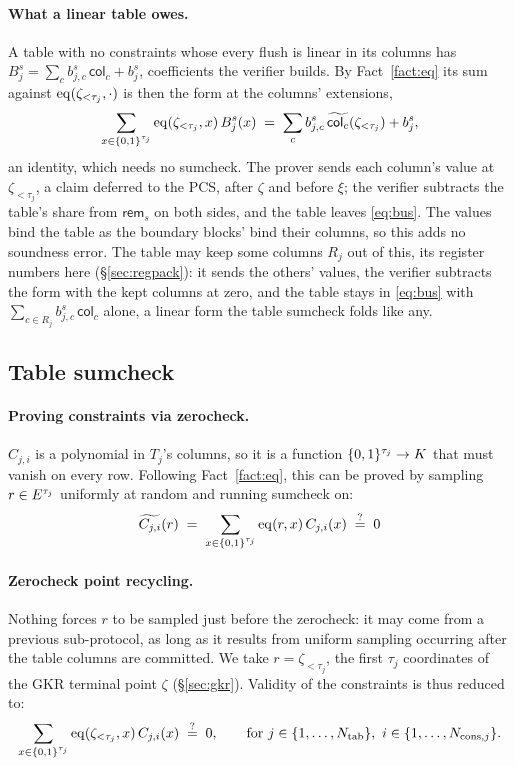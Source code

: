 \paragraph{What a linear table owes.} A table with no constraints whose every flush is linear in its columns has $B^{s}_j=\sum_c b^{s}_{j,c}\,\mathsf{col}_c+b^{s}_{j}$, coefficients the verifier builds. By Fact~\ref{fact:eq} its sum against $\operatorname{eq}(\zeta_{<\tau_j},\cdot)$ is then the form at the columns' extensions,
\[
  \sum_{x\in\{0,1\}^{\tau_j}}\operatorname{eq}(\zeta_{<\tau_j},x)\,B^{s}_j(x)\;=\;\sum_c b^{s}_{j,c}\,\widetilde{\mathsf{col}_c}(\zeta_{<\tau_j})+b^{s}_{j},
\]
an identity, which needs no sumcheck. The prover sends each column's value at $\zeta_{<\tau_j}$, a claim deferred to the PCS, after $\zeta$ and before $\xi$; the verifier subtracts the table's share from $\mathsf{rem}_{s}$ on both sides, and the table leaves \eqref{eq:bus}. The values bind the table as the boundary blocks' bind their columns, so this adds no soundness error. The table may keep some columns $R_j$ out of this, its register numbers here (\S\ref{sec:regpack}): it sends the others' values, the verifier subtracts the form with the kept columns at zero, and the table stays in \eqref{eq:bus} with $\sum_{c\in R_j}b^{s}_{j,c}\,\mathsf{col}_c$ alone, a linear form the table sumcheck folds like any.

\subsection{Table sumcheck}\label{sec:air}

\paragraph{Proving constraints via zerocheck.} $C_{j,i}$ is a polynomial in $T_j$'s columns, so it is a function $\{0,1\}^{\tau_j}\to K$ that must vanish on every row. Following Fact~\ref{fact:eq}, this can be proved by sampling $r\in E^{\tau_j}$ uniformly at random and running sumcheck on:
\[
  \widetilde{C_{j,i}}(r)\;=\;\sum_{x\in\{0,1\}^{\tau_j}}\operatorname{eq}(r,x)\,C_{j,i}(x)\;\stackrel{?}{=}\;0
\]

\paragraph{Zerocheck point recycling.} Nothing forces $r$ to be sampled just before the zerocheck: it may come from a previous sub-protocol, as long as it results from uniform sampling occurring after the table columns are committed. We take $r=\zeta_{<\tau_j}$, the first $\tau_j$ coordinates of the GKR terminal point $\zeta$ (\S\ref{sec:gkr}). Validity of the constraints is thus reduced to:
\begin{equation}\label{eq:cons}
  \sum_{x\in\cube{\tau_j}}\eq(\zeta_{<\tau_j},x)\,C_{j,i}(x)\;\qeq\;0,
  \qquad \text{for } j\in\{1,\dots,\ntab\},\ i\in\{1,\dots,\ncons{j}\}.
\end{equation}

